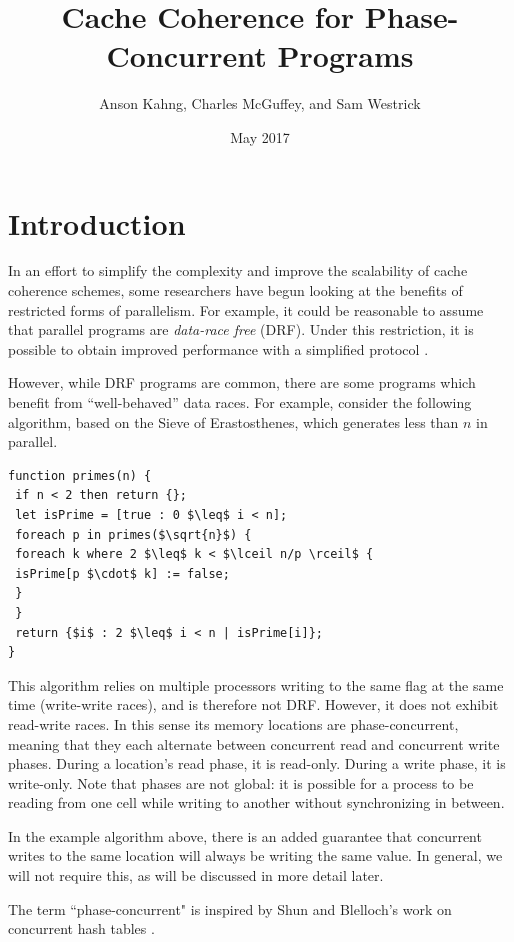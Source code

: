 \documentclass{article}
\title{Cache Coherence for Phase-Concurrent Programs}
\author{Anson Kahng, Charles McGuffey, and Sam Westrick}
\date{May 2017}
\begin{document}
\newcommand{\todo}[1]{{\color{red} [[TODO: {#1}]]}}

\maketitle

\section{Introduction}

In an effort to simplify the complexity and improve the scalability of cache coherence schemes, some researchers have begun looking at the benefits of restricted forms of parallelism. For example, it could be reasonable to assume that parallel programs are \textit{data-race free} (DRF). Under this restriction, it is possible to obtain improved performance with a simplified protocol \cite{choi2010denovo} \cite{ros2012complexity}.

However, while DRF programs are common, there are some programs which benefit from ``well-behaved'' data races. For example, consider the following algorithm, based on the Sieve of Erastosthenes, which generates less than $n$ in parallel.

\begin{lstlisting}
function primes(n) {
 if n < 2 then return {};
 let isPrime = [true : 0 $\leq$ i < n];
 foreach p in primes($\sqrt{n}$) {
 foreach k where 2 $\leq$ k < $\lceil n/p \rceil$ {
 isPrime[p $\cdot$ k] := false;
 }
 }
 return {$i$ : 2 $\leq$ i < n | isPrime[i]};
}
\end{lstlisting}

This algorithm relies on multiple processors writing to the same flag at the same time (write-write races), and is therefore not DRF. However, it does not exhibit read-write races. In this sense its memory locations are phase-concurrent, meaning that they each alternate between concurrent read and concurrent write phases. During a location's read phase, it is read-only. During a write phase, it is write-only. Note that phases are not global: it is possible for a process to be reading from one cell while writing to another without synchronizing in between.

In the example algorithm above, there is an added guarantee that concurrent writes to the same location will always be writing the same value. In general, we will not require this, as will be discussed in more detail later.

The term ``phase-concurrent" is inspired by Shun and Blelloch's work on concurrent hash tables \cite{shun2014phase}.
\end{document}
